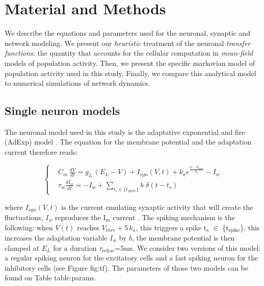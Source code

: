 \documentclass[8pt, colorlinks, a4paper]{article}
\renewcommand\ref{}
\begin{document}
\section{Material and Methods}
\label{sec-3}
\small

We describe the equations and parameters used for the neuronal,
synaptic and network modeling. We present our \emph{heuristic}
treatment of the neuronal \emph{transfer functions}: the quantity that
accounts for the cellular computation in \emph{mean-field} models of
population activity. Then, we present the specific markovian model of
population activity used in this study. Finally, we compare this
analytical model to numerical simulations of network dynamics.

\subsection{Single neuron models}
\label{sec-3-1}

The neuronal model used in this study is the adaptative exponential
and fire (AdExp) model \cite{Brette2005a}. The equation for the membrane
potential and the adaptation current therefore reads:

\begin{equation}
\label{eq:iAdExp}
  \left\{
  \begin{split}
  & C_m\,\frac{dV}{dt} = g_{L} \,(E_{L}-V) + I_{syn}(V,t) + k_a e^{\frac{V - V_{thre} }{k_a}}- I_w \\
  & \tau_w \frac{d I_w}{dt} = - I_w + \sum_{t_s \in \{t_{spike}\}} b \, \, \delta (t-t_s)
  \end{split}
\right.
\end{equation}

where $I_{syn}(V, t)$ is the current emulating synaptic activity that
will create the fluctuations, $I_w$ reproduces the I$_{\text{m}}$ current
\cite{McCormick1985}. The spiking mechanism is the following: when
$V(t)$ reaches \(V_{thre}+5 \, k_a \), this triggers a spike t$_{\text{s}}$ $\in$
\{t$_{\text{spike}}$\}, this increases the adaptation variable $I_w$ by \(b\),
the membrane potential is then clamped at \(E_L\) for a duration
$\tau$$_{\text{refrac}}$=5ms. We consider two versions of this model: a regular
spiking neuron for the excitatory cells and a fast spiking neuron for
the inhibitory cells (see Figure \ref{fig:tf}). The parameters of those two
models can be found on Table \ref{table:params}.
\end{document}
